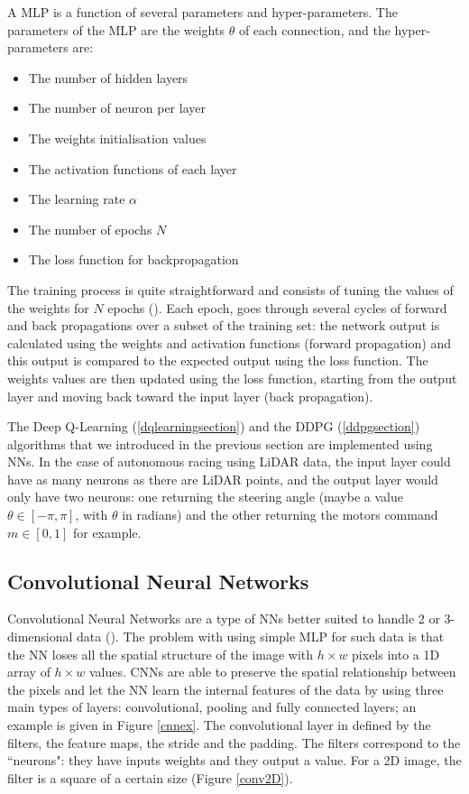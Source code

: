 A MLP is a function of several parameters and hyper-parameters. The parameters of the MLP are the weights $\theta$ of each connection, and the hyper-parameters are:
\begin{itemize}
	\item The number of hidden layers
	\item The number of neuron per layer
	\item The weights initialisation values
	\item The activation functions of each layer
	\item The learning rate $\alpha$
	\item The number of epochs $N$
	\item The loss function for backpropagation
\end{itemize}

The training process is quite straightforward and consists of tuning the values of the weights for $N$ epochs (\cite{mlptraining}). Each epoch, goes through several cycles of forward and back propagations over a subset of the training set: the network output is calculated using the weights and activation functions (forward propagation) and this output is compared to the expected output using the loss function. The weights values are then updated using the loss function, starting from the output layer and moving back toward the input layer (back propagation).


The Deep Q-Learning (\ref{dqlearningsection}) and the DDPG (\ref{ddpgsection}) algorithms that we introduced in the previous section are implemented using NNs. In the case of autonomous racing using LiDAR data, the input layer could have as many neurons as there are LiDAR points, and the output layer would only have two neurons: one returning the steering angle (maybe a value $\theta \in [-\pi,\pi]$, with $\theta$ in radians) and the other returning the motors command $m \in [0,1]$ for example.


\subsection{Convolutional Neural Networks}

Convolutional Neural Networks are a type of NNs better suited to handle 2 or 3-dimensional data (\cite{cnnintro}). The problem with using simple MLP for such data is that the NN loses all the spatial structure of the image with $h \times w$ pixels into a 1D array of $h \times w$ values. CNNs are able to preserve the spatial relationship between the pixels and let the NN learn the internal features of the data by using three main types of layers: convolutional, pooling and fully connected layers; an example is given in Figure \ref{cnnex}. \newline
The convolutional layer in defined by the filters, the feature maps, the stride and the padding. The filters correspond to the ``neurons": they have inputs weights and they output a value. For a 2D image, the filter is a square of a certain size (Figure \ref{conv2D}).

